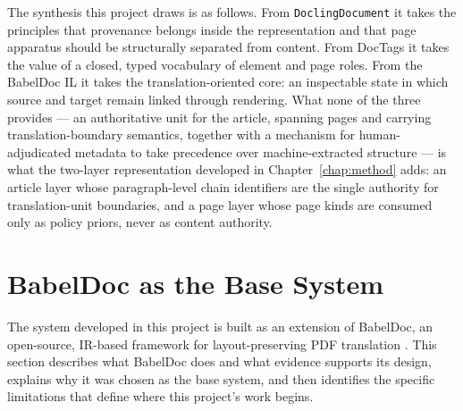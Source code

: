 The synthesis this project draws is as follows. From
\texttt{DoclingDocument} it takes the principles that provenance
belongs inside the representation and that page apparatus should be
structurally separated from content. From DocTags it takes the value of
a closed, typed vocabulary of element and page roles. From the BabelDoc
IL it takes the translation-oriented core: an inspectable state in
which source and target remain linked through rendering. What none of
the three provides --- an authoritative unit for the article, spanning
pages and carrying translation-boundary semantics, together with a
mechanism for human-adjudicated metadata to take precedence over
machine-extracted structure --- is what the two-layer representation
developed in Chapter~\ref{chap:method} adds: an article layer whose
paragraph-level chain identifiers are the single authority for
translation-unit boundaries, and a page layer whose page kinds are
consumed only as policy priors, never as content authority.

\section{BabelDoc as the Base System}
\label{sec:background-babeldoc}

The system developed in this project is built as an extension of
BabelDoc, an open-source, IR-based framework for layout-preserving PDF
translation \cite{qi2026babeldoc}. This section describes what BabelDoc
does and what evidence supports its design, explains why it was chosen
as the base system, and then identifies the specific limitations that
define where this project's work begins.

